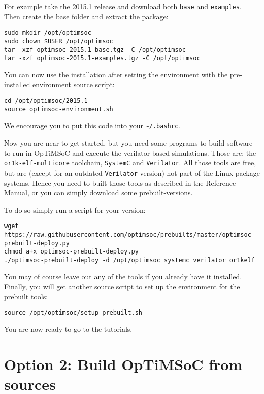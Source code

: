 For example take the 2015.1 release and download both \verb|base| and
\verb|examples|. Then create the base folder and extract the package:

\begin{lstlisting}
sudo mkdir /opt/optimsoc
sudo chown $USER /opt/optimsoc
tar -xzf optimsoc-2015.1-base.tgz -C /opt/optimsoc
tar -xzf optimsoc-2015.1-examples.tgz -C /opt/optimsoc
\end{lstlisting}

You can now use the installation after setting the environment with
the pre-installed environment source script:

\begin{lstlisting}
cd /opt/optimsoc/2015.1
source optimsoc-environment.sh
\end{lstlisting}

We encourage you to put this code into your \verb|~/.bashrc|.

Now you are near to get started, but you need some programs to build
software to run in OpTiMSoC and execute the verilator-based
simulations. Those are: the \verb|or1k-elf-multicore| toolchain,
\verb|SystemC| and \verb|Verilator|. All those tools are free, but are
(except for an outdated \verb|Verilator| version) not part of the
Linux package systems. Hence you need to built those tools as
described in the Reference Manual, or you can simply download some
prebuilt-versions.

To do so simply run a script for your version:

\begin{lstlisting}
wget https://raw.githubusercontent.com/optimsoc/prebuilts/master/optimsoc-prebuilt-deploy.py
chmod a+x optimsoc-prebuilt-deploy.py
./optimsoc-prebuilt-deploy -d /opt/optimsoc systemc verilator or1kelf
\end{lstlisting}

You may of course leave out any of the tools if you already have it
installed. Finally, you will get another source script to set up the
environment for the prebuilt tools:

\begin{lstlisting}
source /opt/optimsoc/setup_prebuilt.sh
\end{lstlisting}

You are now ready to go to the tutorials.

\section{Option 2: Build OpTiMSoC from sources}

